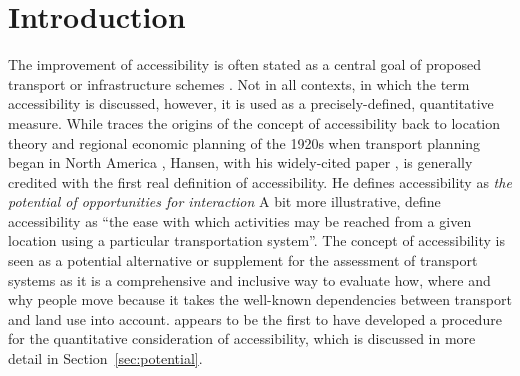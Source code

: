 \section{Introduction}
The improvement of accessibility is often stated as a central goal of proposed transport or infrastructure 
schemes \citep{GeursEtAl2012AccessibilityTransportIntroduction}. Not in all contexts, in which the term 
accessibility is discussed, however, it is used as a precisely-defined, quantitative measure. While 
\citet{Batty2009AccessibilityUnifiedTheory} traces the origins of the concept of accessibility back to 
location theory and regional economic planning of the 1920s when transport planning began in North America
\citep{GeursEtAl2012AccessibilityTransportIntroduction}, 
Hansen, with his widely-cited paper \citep{Hansen1959HowAccessibilityShapesLandUse}, is generally credited 
with the first real definition of accessibility. He defines accessibility 
as \emph{the potential of opportunities for interaction} 
A bit more illustrative, \citet{MorrisEtAl1979AccessibilityIndicators} define accessibility as ``the ease with 
which activities may be reached from a given location using a particular transportation system''.
The concept of accessibility is seen as a potential alternative or supplement for the assessment 
of transport systems as it is a comprehensive and inclusive way to evaluate how, where and why 
people move because it takes the well-known dependencies between transport and land use into account.
\citet{Hansen1959HowAccessibilityShapesLandUse} appears to be the first to have developed a procedure for 
the quantitative consideration of accessibility, which is discussed in more detail in Section~\ref{sec:potential}.



